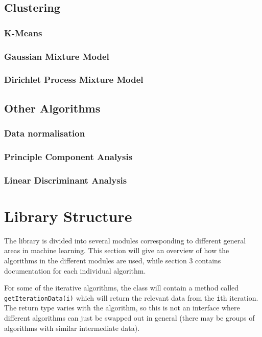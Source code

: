 \documentclass[a4paper]{article}
\begin{document}
\subsection{Clustering}
\subsubsection{K-Means}

\subsubsection{Gaussian Mixture Model}

\subsubsection{Dirichlet Process Mixture Model}


\subsection{Other Algorithms}
\subsubsection{Data normalisation}

\subsubsection{Principle Component Analysis}

\subsubsection{Linear Discriminant Analysis}


\section{Library Structure}
The library is divided into several modules corresponding to different general areas in machine learning. This section will give an overview of how the algorithms in the different modules are used, while section 3 contains documentation for each individual algorithm.

For some of the iterative algorithms, the class will contain a method called \texttt{getIterationData(i)} which will return the relevant data from the \texttt{i}th iteration. The return type varies with the algorithm, so this is not an interface where different algorithms can just be swapped out in general (there may be groups of algorithms with similar intermediate data).
\end{document}
